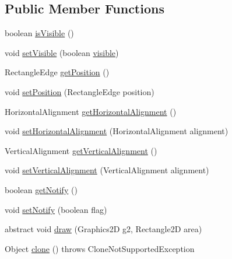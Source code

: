 \subsection*{Public Member Functions}
\begin{DoxyCompactItemize}
\item 
boolean \mbox{\hyperlink{classorg_1_1jfree_1_1chart_1_1title_1_1_title_aab346ae505ab18ec0580d93d3b59fcea}{is\+Visible}} ()
\item 
void \mbox{\hyperlink{classorg_1_1jfree_1_1chart_1_1title_1_1_title_a03df402dfe058a11ab83af3e158a5e2a}{set\+Visible}} (boolean \mbox{\hyperlink{classorg_1_1jfree_1_1chart_1_1title_1_1_title_a8f9f60ec3aba4b287ca8cd9c591cd179}{visible}})
\item 
Rectangle\+Edge \mbox{\hyperlink{classorg_1_1jfree_1_1chart_1_1title_1_1_title_a72a94e96872e69a50ac6fa65f4be0019}{get\+Position}} ()
\item 
void \mbox{\hyperlink{classorg_1_1jfree_1_1chart_1_1title_1_1_title_a5e0ed1b3381e2c376265d81c913fb15b}{set\+Position}} (Rectangle\+Edge position)
\item 
Horizontal\+Alignment \mbox{\hyperlink{classorg_1_1jfree_1_1chart_1_1title_1_1_title_ac3f5c158c4257e5981ce7e2513d28386}{get\+Horizontal\+Alignment}} ()
\item 
void \mbox{\hyperlink{classorg_1_1jfree_1_1chart_1_1title_1_1_title_abbeb751cc0a5669d8abc3575fdf30147}{set\+Horizontal\+Alignment}} (Horizontal\+Alignment alignment)
\item 
Vertical\+Alignment \mbox{\hyperlink{classorg_1_1jfree_1_1chart_1_1title_1_1_title_a994c87ab7e649b6b4a3a3353a9bb40ae}{get\+Vertical\+Alignment}} ()
\item 
void \mbox{\hyperlink{classorg_1_1jfree_1_1chart_1_1title_1_1_title_ad604152c0c53db22105798159f43b50c}{set\+Vertical\+Alignment}} (Vertical\+Alignment alignment)
\item 
boolean \mbox{\hyperlink{classorg_1_1jfree_1_1chart_1_1title_1_1_title_abc0efc874ed0437fba9cfd94c3a56423}{get\+Notify}} ()
\item 
void \mbox{\hyperlink{classorg_1_1jfree_1_1chart_1_1title_1_1_title_a007fba67dedd82a39925e8840c5a891d}{set\+Notify}} (boolean flag)
\item 
abstract void \mbox{\hyperlink{classorg_1_1jfree_1_1chart_1_1title_1_1_title_a5b3e2e024b18d76ef0ba18a03a7ce11c}{draw}} (Graphics2D g2, Rectangle2D area)
\item 
Object \mbox{\hyperlink{classorg_1_1jfree_1_1chart_1_1title_1_1_title_a4e2171f65df200db4325cb23030e390a}{clone}} ()  throws Clone\+Not\+Supported\+Exception 

\end{DoxyCompactItemize}
